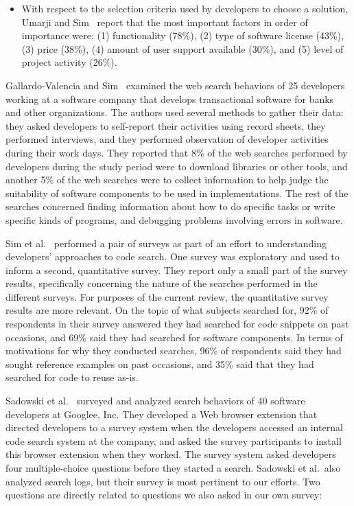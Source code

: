 \documentclass{casicswhitepaper}
\begin{document}
\begin{itemize}
\item With respect to the selection criteria used by developers to choose a solution, Umarji and Sim~\cite{umarji_2013} report that the most important factors in order of importance were: (1) functionality (78\%), (2) type of software license (43\%), (3) price (38\%), (4) amount of user support available (30\%), and (5) level of project activity (26\%).

\end{itemize}

Gallardo-Valencia and Sim~\cite{gallardo2011kinds} examined the web search behaviors of 25 developers working at a software company that develops transactional software for banks and other organizations.  The authors used several methods to gather their data: they asked developers to self-report their activities using record sheets, they performed interviews, and they performed observation of developer activities during their work days.  They reported that 8\% of the web searches performed by developers during the study period were to download libraries or other tools, and another 5\% of the web searches were to collect information to help judge the suitability of software components to be used in implementations.  The rest of the searches concerned finding information about how to do specific tasks or write specific kinds of programs, and debugging problems involving errors in software.

Sim et al.~\cite{sim2012software} performed a pair of surveys as part of an effort to understanding developers' approaches to code search.  One survey was exploratory and used to inform a second, quantitative survey.  They report only a small part of the survey results, specifically concerning the nature of the searches performed in the different surveys.  For purposes of the current review, the quantitative survey results are more relevant.  On the topic of what subjects searched for, 92\% of respondents in their survey answered they had searched for code snippets on past occasions, and 69\% said they had searched for software components.  In terms of motivations for why they conducted searches, 96\% of respondents said they had sought reference examples on past occasions, and 35\% said that they had searched for code to reuse as-is.

Sadowski et al.~\cite{sadowski2015developers} surveyed and analyzed search behaviors of 40 software developers at Googlee, Inc.  They developed a Web browser extension that directed developers to a survey system when the developers accessed an internal code search system at the company, and asked the survey participants to install this browser extension when they worked.  The survey system asked developers four multiple-choice questions before they started a search.  Sadowski et al.\ also analyzed search logs, but their survey is most pertinent to our efforts.  Two questions are directly related to questions we also asked in our own survey:
\end{document}
